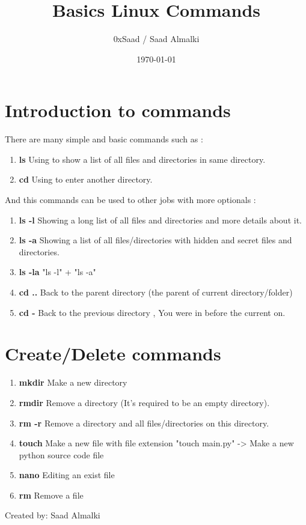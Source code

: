 \documentclass[12pt]{article}
\title{Basics Linux Commands}
\author{0xSaad / Saad Almalki}
\date{\today}
\begin{document}
\maketitle

\section{Introduction to commands}

There are many simple and basic commands such as :
\begin{enumerate}
    \item \textbf{ls} Using to show a list of all files and directories in same directory.
    \item \textbf{cd} Using to enter another directory.
\end{enumerate}

And this commands can be used to other jobs with more optionals :

\begin{enumerate}
    \item \textbf{ls -l} Showing a long list of all files and directories and more details about it.
    \item \textbf{ls -a} Showing a list of all files/directories with hidden and secret files and directories.
    \item \textbf{ls -la} "ls -l" + "ls -a"
    \item \textbf{cd ..} Back to the parent directory (the parent of current directory/folder)
    \item \textbf{cd -} Back to the previous directory , You were in before the current on.
\end{enumerate}



\section{Create/Delete commands}
\begin{enumerate}
    \item \textbf{mkdir} Make a new directory
    \item \textbf{rmdir} Remove a directory (It's required to be an empty directory).
    \item \textbf{rm -r} Remove a directory and all files/directories on this directory.
    \item \textbf{touch} Make a new file with file extension "touch main.py" -> Make a new python source code file
    \item \textbf{nano} Editing an exist file
    \item \textbf{rm} Remove a file
\end{enumerate}



\begin{flushright}
Created by: Saad Almalki \\
\end{flushright}
\end{document}
